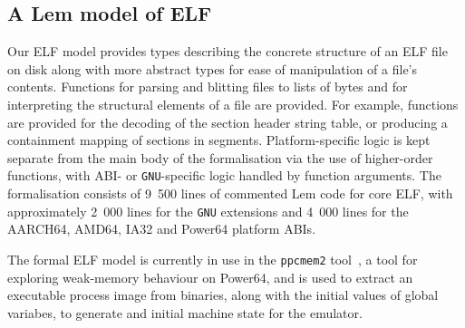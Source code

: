 


\subsection{A Lem model of ELF}
\label{subsect.lem.model.of.elf}

Our ELF model provides types describing the concrete structure of an ELF file on disk along with more abstract types for ease of manipulation of a file's contents.
Functions for parsing and blitting files to lists of bytes and for interpreting the structural elements of a file are provided.
For example, functions are provided for the decoding of the section header string table, or producing a containment mapping of sections in segments.
Platform-specific logic is kept separate from the main body of the formalisation via the use of higher-order functions, with ABI- or \texttt{GNU}-specific logic handled by function arguments.
The formalisation consists of 9~500 lines of commented Lem code for core ELF, with approximately 2~000 lines for the \texttt{GNU} extensions and 4~000 lines for the AARCH64, AMD64, IA32 and Power64 platform ABIs.

The formal ELF model is currently in use in the \texttt{ppcmem2} tool~\cite{gray-integrated-2015}, a tool for exploring weak-memory behaviour on Power64, and is used to extract an executable process image from binaries, along with the initial values of global variabes, to generate and initial machine state for the emulator.

